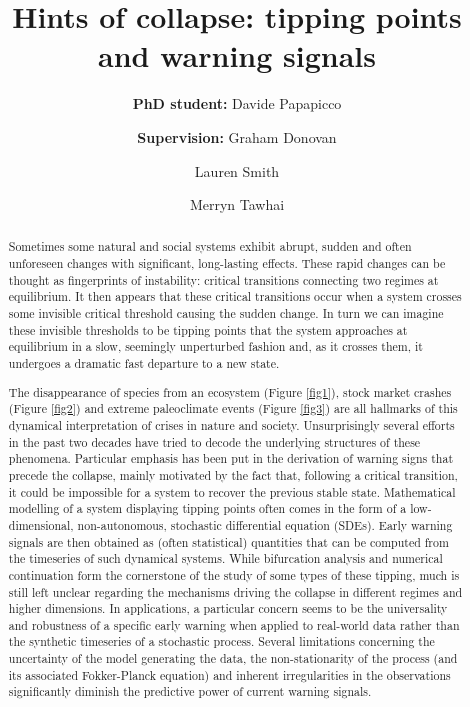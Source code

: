 \documentclass[dvipsnames, table, 11pt]{article}
\begin{document}
\title{Hints of collapse: tipping points and warning signals}

\author[*]{\textbf{PhD student:} Davide Papapicco}
\author[*]{\authorcr \textbf{Supervision:} Graham Donovan}
\author[*]{Lauren Smith}
\author[$\dagger$]{Merryn Tawhai}

 
\date{}

\maketitle

\begin{abstract}
        Sometimes some natural and social systems exhibit abrupt, sudden and often unforeseen changes with significant, long-lasting effects.
        These rapid changes can be thought as fingerprints of instability: critical transitions connecting two regimes at equilibrium.
        It then appears that these critical transitions occur when a system crosses some invisible critical threshold causing the sudden change.
        In turn we can imagine these invisible thresholds to be tipping points that the system approaches at equilibrium in a slow, seemingly unperturbed fashion and, as it crosses them, it undergoes a dramatic fast departure to a new state. 

        The disappearance of species from an ecosystem (Figure \ref{fig1}), stock market crashes (Figure \ref{fig2}) and extreme paleoclimate events (Figure \ref{fig3}) are all hallmarks of this dynamical interpretation of crises in nature and society.
        Unsurprisingly several efforts in the past two decades have tried to decode the underlying structures of these phenomena.
        Particular emphasis has been put in the derivation of warning signs that precede the collapse, mainly motivated by the fact that, following a critical transition, it could be impossible for a system to recover the previous stable state.
        Mathematical modelling of a system displaying tipping points often comes in the form of a low-dimensional, non-autonomous, stochastic differential equation (SDEs).
        Early warning signals are then obtained as (often statistical) quantities that can be computed from the timeseries of such dynamical systems.
        While bifurcation analysis and numerical continuation form the cornerstone of the study of some types of these tipping, much is still left unclear regarding the mechanisms driving the collapse in different regimes and higher dimensions.
        In applications, a particular concern seems to be the universality and robustness of a specific early warning when applied to real-world data rather than the synthetic timeseries of a stochastic process.
        Several limitations concerning the uncertainty of the model generating the data, the non-stationarity of the process (and its associated Fokker-Planck equation) and inherent irregularities in the observations significantly diminish the predictive power of current warning signals.


\end{abstract}
\end{document}
